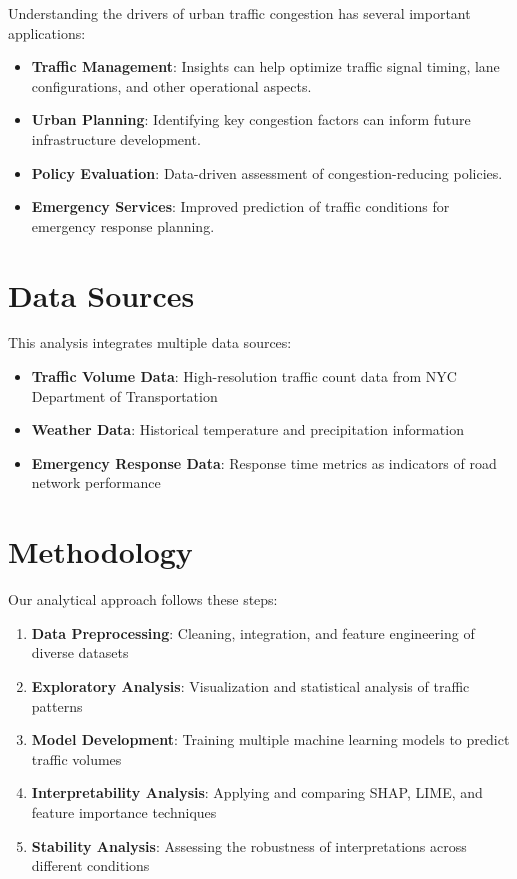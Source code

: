 \documentclass[
  letterpaper,
  DIV=11,
  numbers=noendperiod]{scrreprt}
\providecommand{\tightlist}{%
  \setlength{\itemsep}{0pt}\setlength{\parskip}{0pt}}\usepackage{longtable,booktabs,array}
\begin{document}
Understanding the drivers of urban traffic congestion has several
important applications:

\begin{itemize}
\tightlist
\item
  \textbf{Traffic Management}: Insights can help optimize traffic signal
  timing, lane configurations, and other operational aspects.
\item
  \textbf{Urban Planning}: Identifying key congestion factors can inform
  future infrastructure development.
\item
  \textbf{Policy Evaluation}: Data-driven assessment of
  congestion-reducing policies.
\item
  \textbf{Emergency Services}: Improved prediction of traffic conditions
  for emergency response planning.
\end{itemize}

\section{Data Sources}\label{data-sources}

This analysis integrates multiple data sources:

\begin{itemize}
\tightlist
\item
  \textbf{Traffic Volume Data}: High-resolution traffic count data from
  NYC Department of Transportation
\item
  \textbf{Weather Data}: Historical temperature and precipitation
  information
\item
  \textbf{Emergency Response Data}: Response time metrics as indicators
  of road network performance
\end{itemize}

\section{Methodology}\label{methodology}

Our analytical approach follows these steps:

\begin{enumerate}
\def\labelenumi{\arabic{enumi}.}
\tightlist
\item
  \textbf{Data Preprocessing}: Cleaning, integration, and feature
  engineering of diverse datasets
\item
  \textbf{Exploratory Analysis}: Visualization and statistical analysis
  of traffic patterns
\item
  \textbf{Model Development}: Training multiple machine learning models
  to predict traffic volumes
\item
  \textbf{Interpretability Analysis}: Applying and comparing SHAP, LIME,
  and feature importance techniques
\item
  \textbf{Stability Analysis}: Assessing the robustness of
  interpretations across different conditions
\end{enumerate}
\end{document}
